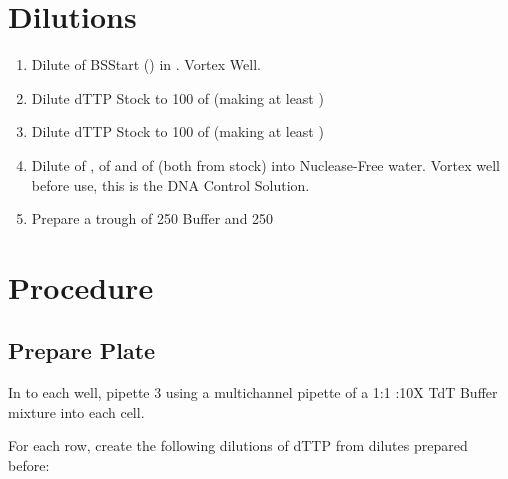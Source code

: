\documentclass{ssiBio}
\begin{document}
\section{Dilutions}
\begin{enumerate}
    \item{Dilute  of BSStart () in . Vortex Well.}
    \item{Dilute  dTTP Stock to 100\uL{} of  (making at least )}
    \item{Dilute  dTTP Stock to 100\uL{} of  (making at least )}
    \item{Dilute  of ,  of  and  of  (both from  stock) into  Nuclease-Free water. Vortex well before use, this is the DNA Control Solution.}
    \item{Prepare a trough of 250\uL{} Buffer and 250\uL{} }
\end{enumerate}

\section{Procedure}%
\subsection{Prepare Plate}
In to each well, pipette 3\uL{} using a multichannel pipette of a 1:1 :10X TdT Buffer mixture into each cell. 

For each row, create the following dilutions of dTTP from dilutes prepared before:
\end{document}

